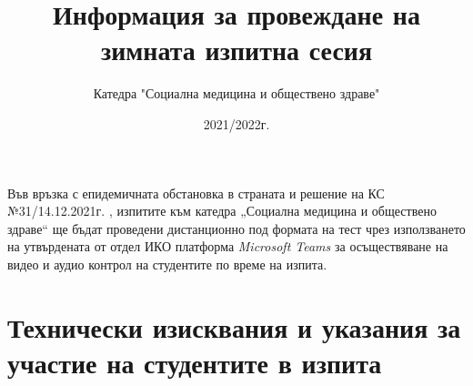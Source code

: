 \documentclass[13pt,a4paper]{article}
\begin{document}
    \title{ Информация за провеждане на зимната изпитна сесия
    }
    \date{2021/2022г.}
    \author{ Катедра "Социална медицина и обществено здраве"}
    \maketitle


    Във връзка с епидемичната обстановка в страната и решение на КС №31/14.12.2021г. , изпитите към катедра „Социална медицина и обществено здраве“ ще бъдат проведени дистанционно под формата на тест чрез използването на утвърдената от отдел ИКО платформа \emph{Microsoft Teams} за осъществяване на видео и аудио контрол на студентите по време на изпита.

    \thispagestyle{fancy}

    \section*{Технически изисквания и указания за участие на студентите в изпита}
\end{document}
